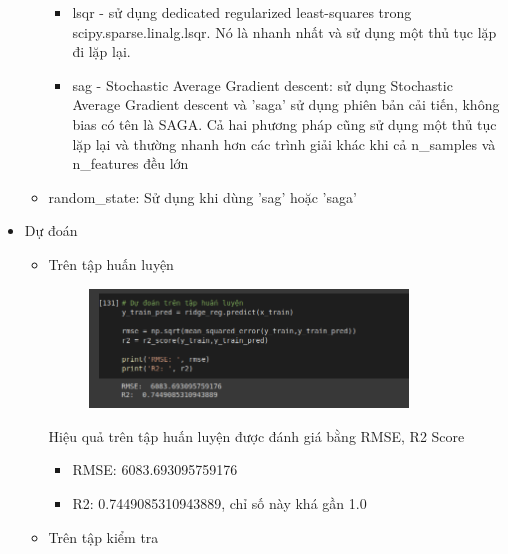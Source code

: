 \documentclass{article}
\begin{document}
\begin{itemize}
\begin{itemize}
\begin{itemize}
				\item lsqr - sử dụng dedicated regularized least-squares trong scipy.sparse.linalg.lsqr. Nó là nhanh nhất và sử dụng một thủ tục lặp đi lặp lại.
				\item sag - Stochastic Average Gradient descent: sử dụng Stochastic Average Gradient descent và 'saga' sử dụng phiên bản cải tiến, không bias có tên là SAGA. Cả hai phương pháp cũng sử dụng một thủ tục lặp lại và thường nhanh hơn các trình giải khác khi cả n\_samples và n\_features đều lớn
			\end{itemize}
			\item random\_state: Sử dụng khi dùng 'sag' hoặc 'saga' 
		\end{itemize}
		\item Dự đoán
		\begin{itemize}
			\item Trên tập huấn luyện
			\begin{figure}[H]
				\centering
				\includegraphics[width=0.85\textwidth]{images/ridge_reg/ridge_reg_predict_train.png}
			\end{figure}
		Hiệu quả trên tập huấn luyện được đánh giá bằng RMSE, R2 Score
		\begin{itemize}
			\item RMSE:  6083.693095759176
			\item R2:  0.7449085310943889, chỉ số này khá gần 1.0
		\end{itemize}
			\item Trên tập kiểm tra
			\begin{figure}[H]
				\centering

\end{figure}
\end{itemize}
\end{itemize}
\end{document}
